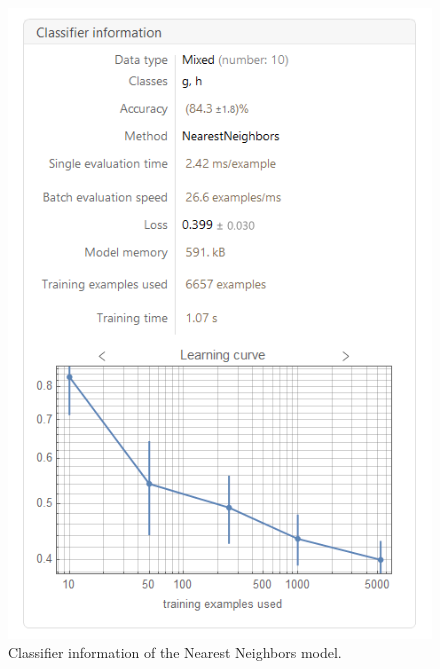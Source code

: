 \documentclass[a4paper, 12pt]{report}
\theoremstyle{definition}
\begin{document}
\begin{figure}[p]
  \centering
  \includegraphics[scale=0.75]{models/knn1.png}
  \caption{Classifier information of the Nearest Neighbors model.}
\end{figure}
\end{document}
